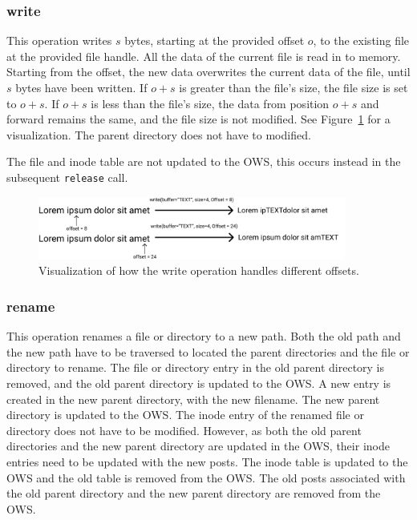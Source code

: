 \subsubsection{write}
This operation writes $s$ bytes, starting at the provided offset $o$, to the existing file at the provided file handle. All the data of the current file is read in to memory. Starting from the offset, the new data overwrites the current data of the file, until $s$ bytes have been written. If $o + s$ is greater than the file's size, the file size is set to $o + s$. If $o + s$ is less than the file's size, the data from position $o + s$ and forward remains the same, and the file size is not modified. See Figure~\ref{fig:write_flow} for a visualization. The parent directory does not have to modified. 

The file and inode table are not updated to the OWS, this occurs instead in the subsequent \texttt{release} call.

\begin{figure}[!ht]
	\begin{center}
	  \includegraphics[width=0.9\textwidth]{figures/write_flow.png}
	\end{center}
	\caption{Visualization of how the write operation handles different offsets.}
	\label{fig:write_flow}
\end{figure}

\subsubsection{rename}
This operation renames a file or directory to a new path. Both the old path and the new path have to be traversed to located the parent directories and the file or directory to rename. The file or directory entry in the old parent directory is removed, and the old parent directory is updated to the OWS. A new entry is created in the new parent directory, with the new filename. The new parent directory is updated to the OWS. The inode entry of the renamed file or directory does not have to be modified. However, as both the old parent directories and the new parent directory are updated in the OWS, their inode entries need to be updated with the new posts. The inode table is updated to the OWS and the old table is removed from the OWS. The old posts associated with the old parent directory and the new parent directory are removed from the OWS.

